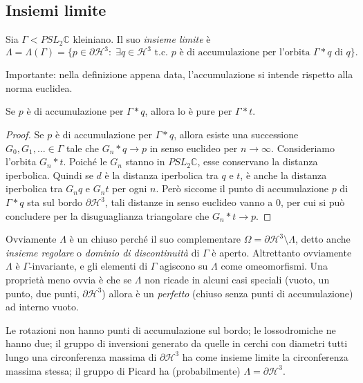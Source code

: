 \subsection{Insiemi limite}
\begin{definizione}
    Sia $\Gamma<PSL_2\mathbb C$ kleiniano. Il suo \emph{insieme limite} è 
    $$\Lambda = \Lambda(\Gamma) = \{p\in\partial\mathcal H^3:\; 
    \exists q\in\mathcal H^3 \text{ t.c. $p$ è di accumulazione per l'orbita $\Gamma*q$ di $q$}\}.$$
\end{definizione}

Importante: nella definizione appena data, l'accumulazione si intende rispetto alla norma euclidea. 

\begin{osservazione}
    Se $p$ è di accumulazione per $\Gamma*q$, allora lo è pure per $\Gamma*t$.
\end{osservazione}
\begin{proof}
    Se $p$ è di accumulazione per $\Gamma*q$, allora esiste una successione $G_0,G_1,\dots\in\Gamma$ tale che $G_n*q\to p$ in senso euclideo per $n\to\infty$.
    Consideriamo l'orbita $G_n*t$. Poiché le $G_n$ stanno in $PSL_2\mathbb C$, esse conservano la distanza iperbolica. Quindi se $d$ è la distanza iperbolica tra $q$ e $t$, è anche la distanza iperbolica tra $G_n q$ e $G_n t$ per ogni $n$. Però siccome il punto di accumulazione $p$ di $\Gamma*q$ sta sul bordo $\partial\mathcal H^3$, tali distanze in senso euclideo vanno a 0, per cui si può concludere per la disuguaglianza triangolare che $G_n * t\to p$.
\end{proof}

\begin{osservazione}
    Ovviamente $\Lambda$ è un chiuso perché il suo complementare $\Omega = \partial\mathcal H^3\setminus \Lambda$, detto anche \emph{insieme regolare} o \emph{dominio di discontinuità} di $\Gamma$ è aperto. 
    Altrettanto ovviamente $\Lambda$ è $\Gamma$-invariante, e gli elementi di $\Gamma$ agiscono su $\Lambda$ come omeomorfismi.
    Una proprietà meno ovvia è che se $\Lambda$ non ricade in alcuni casi speciali (vuoto, un punto, due punti, $\partial\mathcal H^{3}$) allora è un \emph{perfetto} (chiuso senza punti di accumulazione) ad interno vuoto.
\end{osservazione}
\begin{esempio}
	Le rotazioni non hanno punti di accumulazione sul bordo; le lossodromiche ne hanno due; il gruppo di inversioni generato da quelle in cerchi con diametri tutti lungo una circonferenza massima di $\partial \mathcal H^{3}$ ha come insieme limite la circonferenza massima stessa; il gruppo di Picard ha (probabilmente) $\Lambda = \partial \mathcal H^{3}$.
\end{esempio}


